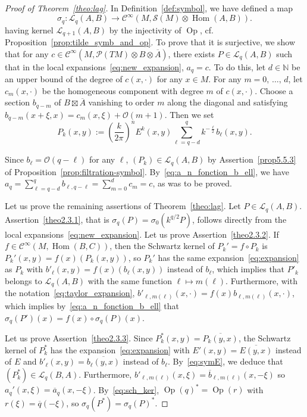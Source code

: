 \documentclass[10pt,a4paper]{article}
\theoremstyle{definition}
\numberwithin{equation}{section}
\newcommand{\N}{{\mathbb{N}}}
\newcommand{\si}{{\sigma}}
\newcommand{\con}{\overline}
\newcommand{\op}{\operatorname}
\newcommand{\Ci}{{\mathcal{C}}^{\infty}}
\newcommand{\bigo}{\mathcal{O}}
\newcommand{\symb}{\mathcal{S}}
\newcommand{\lag}{\mathcal{L}}
\newcommand{\pol}{\mathcal{P}}
\begin{document}
\begin{proof}[Proof of Theorem~\ref{theo:lag}]
In Definition~\ref{def:symbol}, we have defined a map
\[
\si_q : \lag_q(A,B) \rightarrow \Ci (M, \symb (M) \otimes \op{Hom}
(A,B)).
\]
having kernel $\lag_{q+1} (A,B)$ by  the injectivity of $\op{Op}$, cf. Proposition~\ref{prop:tilde_symb_and_op}.  To prove that it is surjective, we show that for any $c \in \Ci (M, \pol (TM) \otimes B \otimes \con{A})$, there exists $P \in \lag_q (A,B)$ such that in the local expansions~\eqref{eq:new_expansion}, $a_q =c$. To do this, let $d \in \N$  be an upper bound of the degree of $c(x, \cdot)$ for any $x\in M$. For any  $m =0, \,\ldots,\, d$,  let $c_m(x,\cdot)$ be the homogeneous component with degree $m$ of $c(x, \cdot)$. Choose a section $b_{q-m}$ of $B \boxtimes
\con{A}$ vanishing to order $m$ along the diagonal and satisfying $b_{q-m} (x+ \xi, x) = c_m (x,\xi) + \bigo (m+1)$. Then we set 
\[
P_k (x,y) := \left(\frac{k}{2\pi} \right)^n E^k(x,y) \sum_{\ell = q-
d }^q k^{-
\frac{\ell}{2}} b_{\ell} (x,y).
\]

Since $b_\ell = \bigo (q-\ell)$ for any $\ell$, $(P_k) \in \lag_q (A,B)$ by Assertion~\eqref{prop5.5.3} of Proposition~\ref{prop:filtration-symbol}.  By~\eqref{eq:a_n_fonction_b_ell}, we have $a_q =  \sum_{\ell = q-d}^q b_{\ell, q- \ell} = \sum_{m=0}^{d} c_{m}  = c$, as was to be proved.

Let us prove the remaining assertions of Theorem~\ref{theo:lag}. Let $P \in \lag_q (A,B)$. Assertion~\eqref{theo2.3.1}, that is $\si _q (P) = \si_0 (k^{q/2} P)$, follows directly from the local expansions~\eqref{eq:new_expansion}. Let us prove Assertion~\eqref{theo2.3.2}. If $f \in \Ci (M,
\op{Hom} (B,C))$, then the Schwartz kernel of $ P_k'= f \circ P_k$ is $P_k' (x,y) = f(x) (P_k (x,y))$, so $P_k'$ has the same expansion~\eqref{eq:expansion} as $P_k$ with $b'_{\ell} (x,y) = f(x)(b_{\ell}(x,y))$ instead of $b_{\ell}$, which implies that $P'_k$ belongs to $\lag_q (A,B)$ with the same function $\ell \mapsto m(\ell) $. Furthermore, with the notation~\eqref{eq:taylor_expansion}, $b'_{\ell, m(\ell)} (x, \cdot) = f(x) b_{\ell, m(\ell)} (x, \cdot)$, which implies by~\eqref{eq:a_n_fonction_b_ell} that $\si_q(P')(x) = f(x) \circ \si_q(P)(x)$.

Let us prove Assertion~\eqref{theo2.3.3}. Since $P_k^* (x,y) = \con{P_k (y,x)}$, the Schwartz kernel of $P_k^*$ has the expansion~\eqref{eq:expansion} with $E' (x,y) =
\con{E (y,x)}$ instead of $E$ and $b'_{\ell} (x,y) = \con{b_{\ell} (y,x)}$ instead of $b_{\ell}$. By~\eqref{eq:symE}, we deduce that $(P_k^*) \in \lag_q (B,A)$. Furthermore, $b'_{\ell, m(\ell)} (x, \xi) = \con{b}_{\ell,m(\ell)}(x, - \xi)$ so $a_q' (x,\xi) = \con{a}_q (x, -\xi)$. By~\eqref{eq:sch_ker}, $\op{Op} (q)^* = \op{Op} (r)$ with $r(\xi) = \con{q} (- \xi)$, so $\si_q(P^*) = \si_q(P)^*$.


\end{proof}
\end{document}
